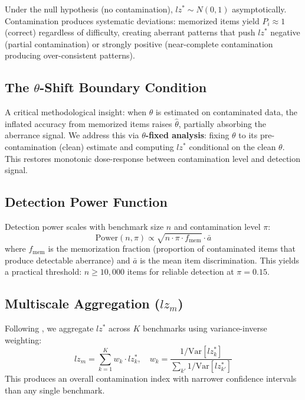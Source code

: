 \documentclass[11pt]{article}
\begin{document}
Under the null hypothesis (no contamination), $lz^* \sim N(0,1)$ asymptotically. Contamination produces systematic deviations: memorized items yield $P_i \approx 1$ (correct) regardless of difficulty, creating aberrant patterns that push $lz^*$ negative (partial contamination) or strongly positive (near-complete contamination producing over-consistent patterns).

\subsection{The $\theta$-Shift Boundary Condition}
\label{sec:theta-shift}

A critical methodological insight: when $\theta$ is estimated on contaminated data, the inflated accuracy from memorized items raises $\hat{\theta}$, partially absorbing the aberrance signal.
We address this via \textbf{$\theta$-fixed analysis}: fixing $\theta$ to its pre-contamination (clean) estimate and computing $lz^*$ conditional on the clean $\theta$.
This restores monotonic dose-response between contamination level and detection signal.

\subsection{Detection Power Function}

Detection power scales with benchmark size $n$ and contamination level $\pi$:
\begin{equation}
\text{Power}(n, \pi) \propto \sqrt{n \cdot \pi \cdot f_{\text{mem}}} \cdot \bar{a}
\end{equation}
where $f_{\text{mem}}$ is the memorization fraction (proportion of contaminated items that produce detectable aberrance) and $\bar{a}$ is the mean item discrimination. This yields a practical threshold: $n \geq 10{,}000$ items for reliable detection at $\pi = 0.15$.

\subsection{Multiscale Aggregation ($lz_m$)}

Following \citet{hong2021}, we aggregate $lz^*$ across $K$ benchmarks using variance-inverse weighting:
\begin{equation}
lz_m = \sum_{k=1}^{K} w_k \cdot lz^*_k, \quad w_k = \frac{1/\text{Var}[lz^*_k]}{\sum_{k'} 1/\text{Var}[lz^*_{k'}]}
\end{equation}
This produces an overall contamination index with narrower confidence intervals than any single benchmark.
\end{document}
